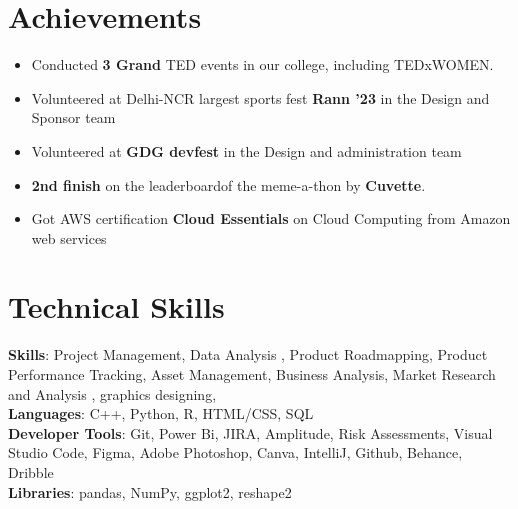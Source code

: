 \documentclass[a4paper,20pt]{article}
\newcommand{\resumeItem}[1]{
  \item\small{
    {#1 \vspace{-2pt}}
  }
}
\newcommand{\resumeItemListStart}{\begin{itemize}}
\newcommand{\resumeItemListEnd}{\end{itemize}\vspace{-5pt}}
\begin{document}
\section{Achievements}
 \begin{itemize}[leftmargin=0.15in, label={}]
    \resumeItemListStart
        \resumeItem{Conducted \textbf{3 Grand} TED events in our college, including TEDxWOMEN.}
        \resumeItem{Volunteered at Delhi-NCR largest sports fest \textbf{Rann '23} in the Design and Sponsor team} 
        \resumeItem{Volunteered at \textbf{GDG  devfest} in the Design and administration team} 
        \resumeItem{\textbf{2nd finish } on the leaderboardof the meme-a-thon by \textbf{Cuvette}.}
        \resumeItem{Got AWS certification \textbf{Cloud Essentials} on Cloud Computing from Amazon web services}
      \resumeItemListEnd
 \end{itemize}
 \vspace{-16pt}

%
\section{Technical Skills}
 \begin{itemize}[leftmargin=0.15in, label={}]
    \small{\item{
    \textbf{Skills}{: Project Management, Data Analysis
, Product Roadmapping, Product Performance Tracking, Asset Management, Business Analysis, Market Research and Analysis
, graphics designing, }\\
     \textbf{Languages}{: C++, Python, R, HTML/CSS, SQL} \\
     \textbf{Developer Tools}{: Git, Power Bi, JIRA, Amplitude, Risk Assessments, Visual Studio Code, Figma, Adobe Photoshop, Canva, IntelliJ, Github, Behance, Dribble} \\
     \textbf{Libraries}{: pandas, NumPy, ggplot2, reshape2 } \\
    }}
 \end{itemize}
 \vspace{-16pt}

 
\end{document}
